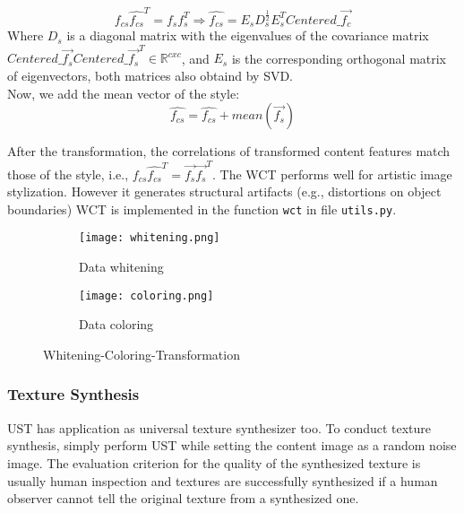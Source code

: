 \begin{equation}
\hat{f_{cs}}\hat{f_{cs}}^T=f_sf_s^T \Rightarrow  \hat{f_{cs}} = E_sD_s^{\frac{1}{2}}E_s^TCentered\_\vec{f_c} 
\end{equation}
Where $D_s$ is a diagonal matrix with the eigenvalues of the covariance matrix $Centered\_\vec{f_s}Centered\_\vec{f_s}^T \in\mathbb{R}^{cxc}$, and $E_s$ is the corresponding orthogonal matrix of eigenvectors, both matrices also obtaind by SVD.\\
Now, we add the mean vector of the style:
\begin{equation}
\hat{f_{cs}} = \hat{f_{cs}}+mean(\vec{f_s})
\end{equation}

After the transformation, the correlations of transformed content features match those of the style, i.e., $\hat{f_{cs}} \hat{f_{cs}}^T = \vec{f_s} \vec{f_s}^T$.
The WCT performs well for artistic image stylization. However it generates
structural artifacts (e.g., distortions on object boundaries)
WCT is implemented in the function \texttt{wct} in file \texttt{utils.py}.

\begin{figure}[h!]
	\centering
	\begin{subfigure}[b]{0.4\linewidth}
		\texttt{[image: whitening.png]}
		\caption{Data whitening}
	\end{subfigure}
	\begin{subfigure}[b]{0.4\linewidth}
		\texttt{[image: coloring.png]}
		\caption{Data coloring}
	\end{subfigure}
	\caption{Whitening-Coloring-Transformation}
	\label{fig:WCT-vis}
\end{figure}

\subsubsection{Texture Synthesis}\label{subsec:texture}
UST has application as universal texture synthesizer too. To conduct texture synthesis, simply perform UST while setting the content image as a random noise image. The evaluation criterion for the quality of the synthesized texture is usually human inspection and textures are successfully synthesized if a human observer cannot tell the original texture from a synthesized one.
